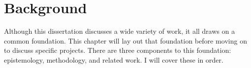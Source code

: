 \chapter{Background}


Although this dissertation discusses a wide variety of work, it all draws on a common foundation. This chapter will lay out that foundation before moving on to discuss specific projects. There are three components to this foundation: epistemology, methodology, and related work. I will cover these in order.








